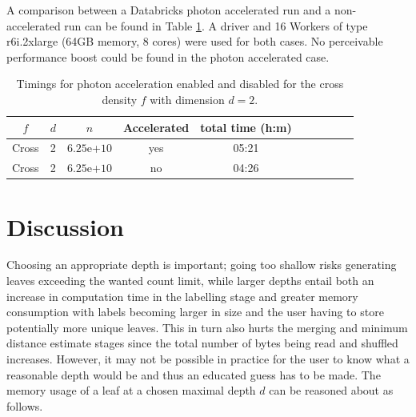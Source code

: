 \documentclass{report}
\begin{document}
A comparison between a Databricks photon accelerated run and a non-accelerated run can be found in Table \ref{photon_1TB}. A driver and 16 Workers of type r6i.2xlarge (64GB memory, 8 cores) were used for
both cases. No perceivable performance boost could be found in the photon accelerated case. 

\begin{table}[htbp]
\begin{center}
\begin{tabular}{|c  c  c  c | c | c  | c | c | c | c |}
	\hline
	$f$ &  $d$ & $n$ & Accelerated & total time (h:m) \\
	\hline
	Cross  	& 2 & $6.25$e+$10$ & yes & 05:21 \\
	\hline
	Cross  	& 2 & $6.25$e+$10$ & no & 04:26 \\
	\hline
\end{tabular}
\end{center}
\caption{Timings for photon acceleration enabled and disabled for the cross density $f$ with dimension $d=2$. }
\label{photon_1TB}
\end{table}

\section{Discussion}

Choosing an appropriate depth is important; going too shallow risks generating leaves exceeding the wanted count limit, while
larger depths entail both an increase in computation time in the labelling stage and greater memory consumption with labels becoming larger in size and the user having to store potentially more unique leaves.
This in turn also hurts the merging and minimum distance estimate stages since the total number of 
bytes being read and shuffled increases.
However, it may not be possible in practice for the user to know what a reasonable depth would be and thus an educated guess has to be made. The memory usage of a leaf at a chosen maximal depth $d$ can be reasoned about as follows.
\end{document}
